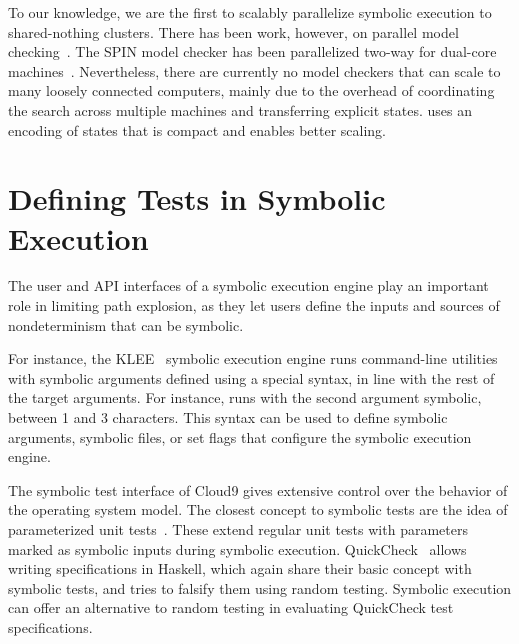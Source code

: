 
To our knowledge, we are the first to scalably parallelize symbolic execution to shared-nothing clusters.  There has been work, however, on parallel model checking~\cite{parallelMurphi,distributed-spin,loadBalModelchecking,spin:multicore-modelchecking,modelCheckBDD}.  The SPIN model checker has been parallelized two-way for dual-core machines~\cite{parallelSPIN}. Nevertheless, there are currently no model checkers that can scale to many loosely connected computers, mainly due to the overhead of coordinating the search across multiple machines and transferring explicit states. \cnine uses an encoding of states that is compact and enables better scaling.


\section{Defining Tests in Symbolic Execution}

The user and API interfaces of a symbolic execution engine play an important role in limiting path explosion, as they let users define the inputs and sources of nondeterminism that can be symbolic.

For instance, the KLEE~\cite{klee} symbolic execution engine runs command-line utilities with symbolic arguments defined using a special syntax, in line with the rest of the target arguments.  For instance,  runs  with the second argument symbolic, between 1 and 3 characters.  This syntax can be used to define symbolic arguments, symbolic files, or set flags that configure the symbolic execution engine.

The symbolic test interface of Cloud9 gives extensive control over the behavior of the operating system model.  
%
The closest concept to symbolic tests are the idea of parameterized unit tests~\cite{tillmann-puts}. These extend regular unit tests with parameters marked as symbolic inputs during symbolic execution.
%
QuickCheck~\cite{quickcheck} allows writing specifications in Haskell, which again share their basic concept with symbolic tests, and tries to falsify them using random testing.  Symbolic execution can offer an alternative to random testing in evaluating QuickCheck test specifications.


